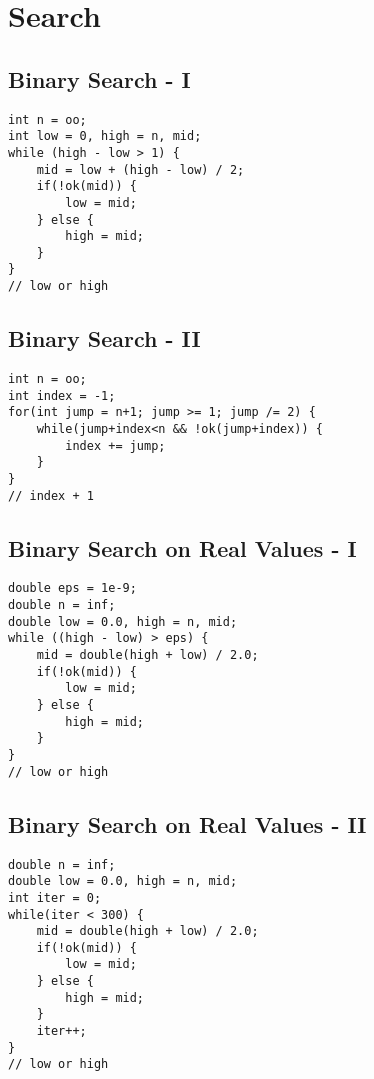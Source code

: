 \documentclass[10pt,letterpaper,twocolumn,twosided]{article}
\begin{document}
\section{Search}

\subsection{Binary Search - I}
\begin{lstlisting}
int n = oo;
int low = 0, high = n, mid;
while (high - low > 1) {
    mid = low + (high - low) / 2;
    if(!ok(mid)) {
        low = mid;
    } else {
        high = mid;
    }
}
// low or high
\end{lstlisting}

\subsection{Binary Search - II}
\begin{lstlisting}
int n = oo;
int index = -1;
for(int jump = n+1; jump >= 1; jump /= 2) {
    while(jump+index<n && !ok(jump+index)) {
        index += jump;
    }
}
// index + 1
\end{lstlisting}

\subsection{Binary Search on Real Values - I}
\begin{lstlisting}
double eps = 1e-9;
double n = inf;
double low = 0.0, high = n, mid;
while ((high - low) > eps) {
    mid = double(high + low) / 2.0;
    if(!ok(mid)) {
        low = mid;
    } else {
        high = mid;
    }
}
// low or high
\end{lstlisting}

\subsection{Binary Search on Real Values - II}
\begin{lstlisting}
double n = inf;
double low = 0.0, high = n, mid;
int iter = 0;
while(iter < 300) {
    mid = double(high + low) / 2.0;
    if(!ok(mid)) {
        low = mid;
    } else {
        high = mid;
    }
    iter++;
}
// low or high
\end{lstlisting}
\end{document}

